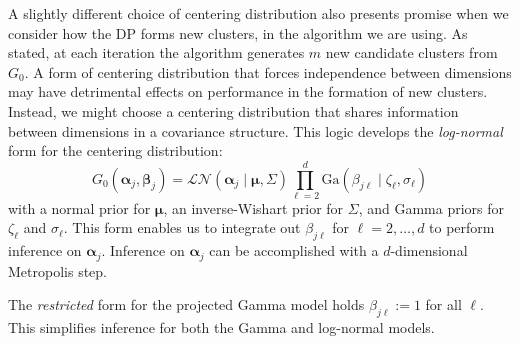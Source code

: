 A slightly different choice of centering distribution also presents promise when we consider how the DP forms new clusters, in the algorithm we are using.  As stated, at each iteration the algorithm generates $m$ new candidate clusters from $G_0$.  A form of centering distribution that forces independence between dimensions may have detrimental effects on performance in the formation of new clusters.  Instead, we might choose a centering distribution that shares information between dimensions in a covariance structure.  This logic develops the \emph{log-normal} form for the centering distribution:
\begin{equation}
    G_0(\bm{\alpha}_j,\bm{\beta}_j) = \mathcal{LN}\left(\bm{\alpha}_j\mid\bm{\mu},\Sigma\right)\prod_{\ell = 2}^d\text{Ga}\left(\beta_{j\ell}\mid\zeta_\ell,\sigma_\ell\right)
\end{equation}
with a normal prior for $\bm{\mu}$, an inverse-Wishart prior for $\Sigma$, and Gamma priors for $\zeta_{\ell}$ and $\sigma_{\ell}$.  This form enables us to integrate out $\beta_{j\ell}$ for $\ell = 2,\ldots, d$ to perform inference on $\bm{\alpha}_j$.  Inference on $\bm{\alpha}_j$ can be accomplished with a $d$-dimensional Metropolis step.

The \emph{restricted} form for the projected Gamma model holds $\beta_{j\ell} := 1$ for all $\ell$.  This simplifies inference for both the Gamma and log-normal models.





